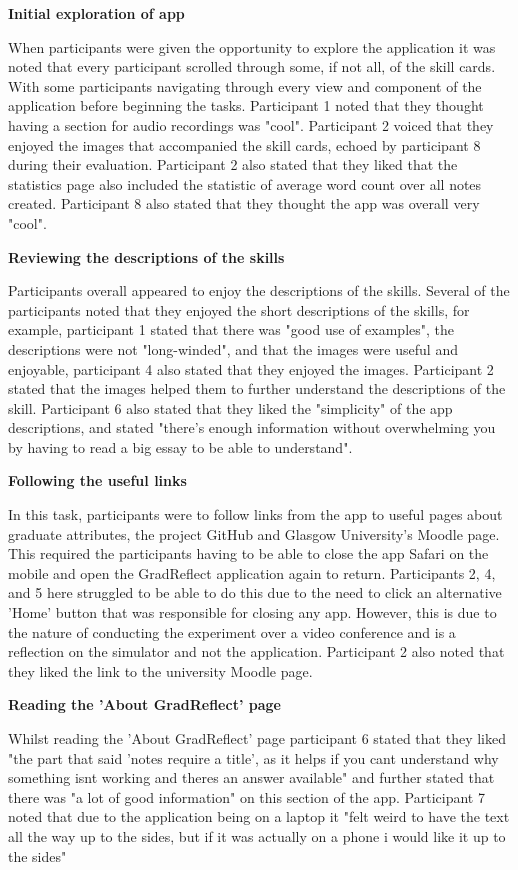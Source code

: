 \documentclass{l4proj}
\begin{document}
\textbf{Initial exploration of app}

When participants were given the opportunity to explore the application it was noted that every participant scrolled through some, if not all, of the skill cards. With some participants navigating through every view and component of the application before beginning the tasks. Participant 1 noted that they thought having a section for audio recordings was "cool". Participant 2 voiced that they enjoyed the images that accompanied the skill cards, echoed by participant 8 during their evaluation. Participant 2 also stated that they liked that the statistics page also included the statistic of average word count over all notes created. Participant 8 also stated that they thought the app was overall very "cool".

\textbf{Reviewing the descriptions of the skills}

Participants overall appeared to enjoy the descriptions of the skills. Several of the participants noted that they enjoyed the short descriptions of the skills, for example, participant 1 stated that there was "good use of examples", the descriptions were not "long-winded", and that the images were useful and enjoyable, participant 4 also stated that they enjoyed the images. Participant 2 stated that the images helped them to further understand the descriptions of the skill. Participant 6 also stated that they liked the "simplicity" of the app descriptions, and stated "there's enough information without overwhelming you by having to read a big essay to be able to understand".

\textbf{Following the useful links}

In this task, participants were to follow links from the app to useful pages about graduate attributes, the project GitHub and Glasgow University's Moodle page. This required the participants having to be able to close the app Safari on the mobile and open the GradReflect application again to return. Participants 2, 4, and 5 here struggled to be able to do this due to the need to click an alternative 'Home' button that was responsible for closing any app. However, this is due to the nature of conducting the experiment over a video conference and is a reflection on the simulator and not the application. Participant 2 also noted that they liked the link to the university Moodle page.

\textbf{Reading the 'About GradReflect' page}

Whilst reading the 'About GradReflect' page participant 6 stated that they liked "the part that said 'notes require a title', as it helps if you cant understand why something isnt working and theres an answer available" and further stated that there was "a lot of good information" on this section of the app. Participant 7 noted that due to the application being on a laptop it "felt weird to have the text all the way up to the sides, but if it was actually on a phone i would like it up to the sides"
\end{document}
